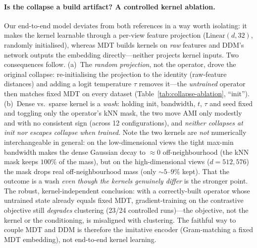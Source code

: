\documentclass[10pt,twocolumn]{article}
\begin{document}
\paragraph{Is the collapse a build artifact? A controlled kernel ablation.}
Our end-to-end model deviates from both references in a way worth isolating: it makes the kernel
learnable through a per-view feature projection ($\mathrm{Linear}(d,32)$, randomly initialised),
whereas MDT builds kernels on \emph{raw} features and DDM's network outputs the embedding
directly---neither projects kernel inputs. Two consequences follow. (a)~The \emph{random projection},
not the operator, drove the original collapse: re-initialising the projection to the identity
(raw-feature distances) and adding a logit temperature $\tau$ removes it---the \emph{untrained} operator
then matches fixed MDT on every dataset (Table~\ref{tab:collapse-ablation}, ``init''). (b)~Dense vs.\
sparse kernel is a \emph{wash}: holding init, bandwidth, $t$, $\tau$ and seed fixed and toggling only
the operator's kNN mask, the two move AMI only modestly and with no consistent sign (across 12
configurations), and \emph{neither collapses at init nor escapes collapse when trained}. Note the two
kernels are \emph{not} numerically interchangeable in general: on the low-dimensional views the tight
max-min bandwidth makes the dense Gaussian decay to ${\approx}0$ off-neighbourhood (the kNN mask keeps
$100\%$ of the mass), but on the high-dimensional views ($d{=}512,576$) the mask drops real
off-neighbourhood mass (only ${\sim}5$--$9\%$ kept). That the outcome is a wash \emph{even though the
kernels genuinely differ} is the stronger point. The robust,
kernel-independent conclusion: with a correctly-built operator whose untrained state already equals
fixed MDT, gradient-training on the contrastive objective still \emph{degrades} clustering (23/24
controlled runs)---the objective, not the kernel or the conditioning, is misaligned with clustering.
The faithful way to couple MDT and DDM is therefore the imitative encoder (Gram-matching a fixed MDT
embedding), not end-to-end kernel learning.
\end{document}
